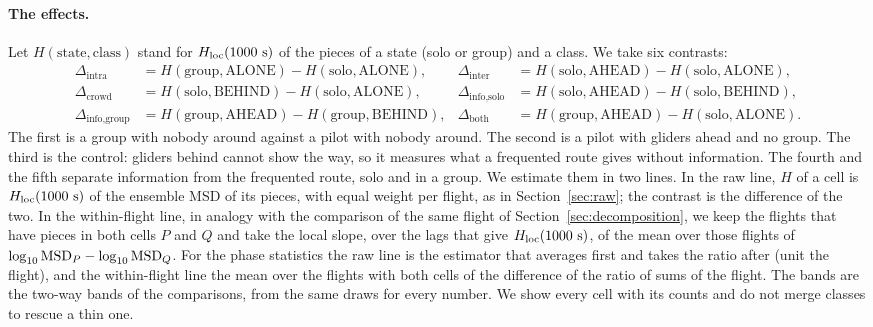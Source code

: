 \paragraph{The effects.} Let $H(\text{state},\text{class})$ stand for $\Hk$ of the pieces of a state (solo or group) and a class. We take six contrasts:
\begin{align*}
  \Delta_\text{intra} &= H(\text{group},\text{ALONE})-H(\text{solo},\text{ALONE}), & \Delta_\text{inter} &= H(\text{solo},\text{AHEAD})-H(\text{solo},\text{ALONE}),\\
  \Delta_\text{crowd} &= H(\text{solo},\text{BEHIND})-H(\text{solo},\text{ALONE}), & \Delta_\text{info,solo} &= H(\text{solo},\text{AHEAD})-H(\text{solo},\text{BEHIND}),\\
  \Delta_\text{info,group} &= H(\text{group},\text{AHEAD})-H(\text{group},\text{BEHIND}), & \Delta_\text{both} &= H(\text{group},\text{AHEAD})-H(\text{solo},\text{ALONE}).
\end{align*}
The first is a group with nobody around against a pilot with nobody around. The second is a pilot with gliders ahead and no group. The third is the control: gliders behind cannot show the way, so it measures what a frequented route gives without information. The fourth and the fifth separate information from the frequented route, solo and in a group.
We estimate them in two lines. In the raw line, $H$ of a cell is $\Hk$ of the ensemble MSD of its pieces, with equal weight per flight, as in Section~\ref{sec:raw}; the contrast is the difference of the two. In the within-flight line, in analogy with the comparison of the same flight of Section~\ref{sec:decomposition}, we keep the flights that have pieces in both cells $P$ and $Q$ and take the local slope, over the lags that give $\Hk$, of the mean over those flights of $\log_{10}\mathrm{MSD}_P-\log_{10}\mathrm{MSD}_Q$. For the phase statistics the raw line is the estimator that averages first and takes the ratio after (unit the flight), and the within-flight line the mean over the flights with both cells of the difference of the ratio of sums of the flight. The bands are the two-way bands of the comparisons, from the same draws for every number. We show every cell with its counts and do not merge classes to rescue a thin one.

\begin{table}
\centering\small

\caption{The cells of the state and the class at $R=\IgRMain$~km, with the pieces, the flights and the pilots of each, $\Hk$ with its 90\% band, and the six contrasts of $\Hk$, raw and within the flight (flights with both cells in brackets). BEHIND is the thinnest cell and MIXED is not interpreted. At 2 and \IgRadHigh~km see Appendix~\ref{app:intergroup}.}
\label{tab:intergroup}
\end{table}

